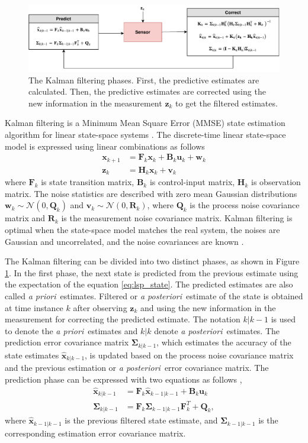 \documentclass[english, 12pt, a4paper, elec, utf8, a-1b, online]{aaltothesis}
\numberwithin{equation}{section}
\renewcommand{\vec}[1]{\mathbf{#1}}
\newcommand{\xprior}{\hat{\vec{x}}_{k|k-1}}
\newcommand{\xlast}{\hat{\vec{x}}_{k-1|k-1}}
\newcommand{\priorecov}{\boldsymbol{\Sigma}_{k|k-1}}
\newcommand{\lastecov}{\boldsymbol{\Sigma}_{k-1|k-1}}
\newcommand{\x}{\vec{x}_k}
\newcommand{\xnext}{\vec{x}_{k+1}}
\newcommand{\z}{\vec{z}_k}
\newcommand{\stmodel}{\vec{F}_k}
\newcommand{\cimodel}{\vec{B}_k}
\newcommand{\cinput}{\vec{u}_k}
\newcommand{\pnoise}{\vec{w}_k}
\newcommand{\omodel}{\vec{H}_k}
\newcommand{\onoise}{\vec{v}_k}
\newcommand{\ocov}{\vec{R}_k}
\newcommand{\pcov}{\vec{Q}_k}
\newcommand{\normal}[2]{\mathcal{N}\left(#1, #2 \right)}
\def\prior{\textit{a priori}\ }
\def\post{\textit{a posteriori}\ }
\begin{document}
\begin{figure}[b]
    \centering
    \includegraphics[width=\textwidth]{figures/KF.pdf}
    \caption{The Kalman filtering phases.
    First, the predictive estimates are calculated.
    Then, the predictive estimates are corrected using the new information in the measurement $\z$ to get the filtered estimates.
    }
    \label{fig:KF}
\end{figure}

Kalman filtering is a Minimum Mean Square Error (MMSE) state estimation algorithm for linear state-space systems \cite{Zarchan2000}.
The discrete-time linear state-space model is expressed using linear combinations as follows \cite{Zarchan2000}
\begin{align}
    \xnext &= \stmodel \x + \cimodel \cinput + \pnoise \label{eq:lsp_state} \\
    \z &= \omodel \x + \onoise \label{eq:lsp_obs}
\end{align}
where $\stmodel$ is state transition matrix, $\cimodel$ is control-input matrix, $ \omodel $ is observation matrix. 
The noise statistics are described with zero mean Gaussian distributions $\pnoise \sim \normal{0}{\pcov}$ and $\onoise \sim \normal{0}{\ocov}$, where $\pcov$ is the process noise covariance matrix and $\ocov$ is the measurement noise covariance matrix.
Kalman filtering is optimal when the state-space model matches the real system, the noises are Gaussian and uncorrelated, and the noise covariances are known \cite{Zarchan2000}.

The Kalman filtering can be divided into two distinct phases, as shown in Figure \ref{fig:KF}.
In the first phase, the next state is predicted from the previous estimate using the expectation of the equation \eqref{eq:lsp_state}.
The predicted estimates are also called \prior estimates.
Filtered or \post estimate of the state is obtained at time instance $k$ after observing $\z$ and using the new information in the measurement for correcting the predicted estimate. 
The notation $k|k-1$ is used to denote the \prior estimates and $k|k$ denote \post estimates.
The prediction error covariance matrix $\priorecov$, which estimates the accuracy of the state estimates $\xprior$, is updated based on the process noise covariance matrix and the previous estimation or \post error covariance matrix.
The prediction phase can be expressed with two equations as follows \cite{Zarchan2000},
\begin{align}
    \xprior &= \stmodel \xlast + \cimodel \cinput \label{eq:kf_pred_x} \\ 
    \priorecov &= \stmodel \lastecov \stmodel^T + \pcov \label{eq:kf_prior_error_cov},
\end{align}
where $\xlast$ is the previous filtered state estimate, and $\lastecov$ is the corresponding estimation error covariance matrix.
\end{document}
